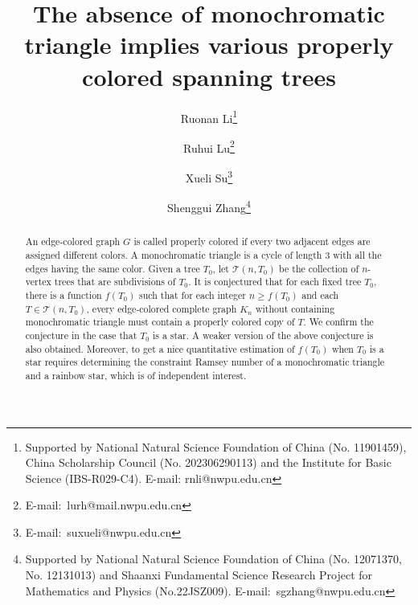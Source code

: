 \documentclass[11pt,a4paper]{article}
\title{\Large \bf The absence of monochromatic triangle implies various properly colored spanning trees}
\theoremstyle{definition}
\begin{document}
\date{}
\author[1,2]{\small Ruonan Li\thanks{Supported by National Natural Science Foundation of China (No. 11901459), China Scholarship Council (No. 202306290113) and the Institute for Basic Science (IBS-R029-C4). E-mail: rnli@nwpu.edu.cn}}
\author[1,2]{\small Ruhui Lu\thanks{E-mail:~lurh@mail.nwpu.edu.cn}}
\author[1,2]{\small Xueli Su\thanks{E-mail:~suxueli@nwpu.edu.cn}}
\author[1,2]{\small Shenggui Zhang\thanks{Supported by National Natural Science Foundation of China (No. 12071370, No. 12131013) and Shaanxi Fundamental Science Research Project for Mathematics and Physics (No.22JSZ009). E-mail:~sgzhang@nwpu.edu.cn}}
\maketitle

\begin{abstract}
An edge-colored graph $G$ is called properly colored if every two adjacent edges are assigned different colors. A monochromatic triangle is a cycle of length 3 with all the edges having the same color. Given a tree $T_0$, let $\mathcal{T}(n,T_0)$ be the collection of $n$-vertex trees that are subdivisions of $T_0$. It is conjectured that for each fixed tree $T_0$, there is a function $f(T_0)$ such that for each integer $n\geq f(T_0)$ and each $T\in \mathcal{T}(n,T_0)$, every edge-colored complete graph $K_n$ without containing monochromatic triangle must contain a properly colored copy of $T$. We confirm the conjecture in the case that $T_0$ is a star. A weaker version of the above conjecture is also obtained. Moreover, to get a nice quantitative estimation of $f(T_0)$ when $T_0$ is a star requires determining the constraint Ramsey number of a monochromatic triangle and a rainbow star, which is of independent interest.

\end{abstract}
\end{document}
